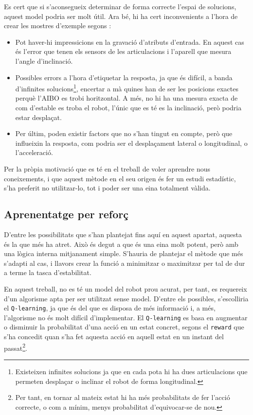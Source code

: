 \documentclass[12pt,a4paper,final,twoside]{report}
\begin{document}
Es cert que si s'aconsegueix determinar de forma correcte l'espai de solucions, aquest model podria ser molt útil. Ara bé, hi ha cert inconvenients a l'hora de crear les mostres d'exemple segons \cite{Alpaydin2004}:

\begin{itemize}

\item Pot haver-hi impressicions en la gravació d'atributs d'entrada. En aquest cas és l'error que tenen els sensors de les articulacions i l'aparell que mesura l'angle d'inclinació.

\item Possibles errors a l'hora d'etiquetar la resposta, ja que és difícil, a banda d'infinites solucions\footnote{Existeixen infinites solucions ja que en cada pota hi ha dues articulacions que permeten desplaçar o inclinar el robot de forma longitudinal.}, encertar a mà quines han de ser les posicions exactes perquè l'AIBO es trobi horitzontal. A més, no hi ha una mesura exacta de com d'estable es troba el robot, l'únic que es té es la inclinació, però podria estar desplaçat.

\item Per últim, poden existir factors que no s'han tingut en compte, però que influeixin la resposta, com podria ser el desplaçament lateral o longitudinal, o l'acceleració.
\end{itemize}

Per la pròpia motivació que es té en el treball de voler aprendre nous coneixements, i que aquest mètode en el seu origen és fer un estudi estadístic, s'ha preferit no utilitzar-lo, tot i poder ser una eina totalment vàlida.

\subsection{Aprenentatge per reforç}

D'entre les possibilitats que s'han plantejat fins aquí en aquest apartat, aquesta és la que més ha atret. Això és degut a que és una eina molt potent, però amb una lògica interna mitjanament simple. S'hauria de plantejar el mètode que més s'adapti al cas, i llavors crear la funció a minimitzar o maximitzar per tal de dur a terme la tasca d'estabilitat.

En aquest treball, no es té un model del robot prou acurat, per tant, es requereix d'un algorisme apta per ser utilitzat sense model. D'entre els possibles, s'escolliria el \texttt{Q-learning}, ja que és del que es disposa de més informació i, a més, l'algorisme no és molt difícil d'implementar. El \texttt{Q-learning} es basa en augmentar o disminuir la probabilitat d'una acció en un estat concret, segons el \texttt{reward} que s'ha concedit quan s'ha fet aquesta acció en aquell estat en un instant del passat\footnote{Per tant, en tornar al mateix estat hi ha més probabilitats de fer l'acció correcte, o com a mínim, menys probabilitat d'equivocar-se de nou.}.
\end{document}
